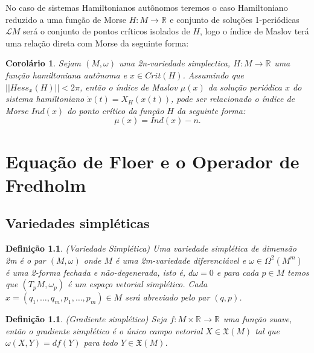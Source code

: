 \documentclass[12pt]{book}
\newtheorem{corolario}[teorema]{Corolário}
\newtheorem{definicao}[teorema]{Definição}
\newcommand{\real}[1]{\mathbb{R}^{#1}}
\newcommand{\solucoesperiodicascontrateis}{\mathcal{L}M}
\begin{document}
	No caso de sistemas Hamiltonianos autônomos teremos o caso Hamiltoniano reduzido a uma função de Morse $H:M\to \real{}$ e conjunto de soluções 1-periódicas $\solucoesperiodicascontrateis$ será o conjunto de pontos críticos isolados de $H$, logo o índice de Maslov terá uma relação direta com Morse da seguinte forma:
	
	\begin{corolario}
		Sejam $(M, \omega)$ uma 2n-variedade simplectica, $H : M \to \real{}$ uma função hamiltoniana autônoma e $x \in Crit(H)$. Assumindo que $||Hess_{x}(H)|| < 2\pi$, então o índice de Maslov $\mu(x)$ da solução periódica $x$ do sistema hamiltoniano $\dot{x}(t) = X_{H}(x(t))$, pode ser relacionado o índice de Morse $Ind(x)$ do ponto crítico da função $H$ da seguinte forma:
		$$
		\mu(x) = Ind(x) - n.
		$$
	\end{corolario}	
	
	\chapter{Equação de Floer e o Operador de Fredholm}
	\section{Variedades simpléticas}
	\begin{definicao}
		(Variedade Simplética) Uma variedade simplética de dimensão 2m é o par $(M, \omega)$ onde $M$ é uma 2m-variedade diferenciável e $\omega \in \Omega^{2}(M^{m})$ é uma 2-forma fechada e não-degenerada, isto é, $d\omega = 0$ e para cada $p \in M$ temos que $(T_{p}M, \omega_{p})$ é um espaço vetorial simplético. Cada $x = (q_{1}, \dots, q_{m}, p_{1}, \dots, p_{m}) \in M$  será abreviado pelo par $(q,p)$.
	\end{definicao}
	
	\begin{definicao}
		(Gradiente simplético) Seja $f : M \times \real{} \to \real{}$ uma função suave, então o gradiente simplético é o único campo vetorial $X \in \mathfrak{X}(M)$ tal que $\omega(X, Y) = df(Y)$ para todo $Y \in \mathfrak{X}(M)$.
	\end{definicao}
	
\end{document}
